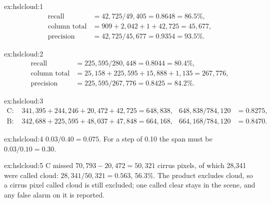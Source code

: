 
\begin{solution}{ex:hslcloud:1}
\begin{align*}
\text{recall} &= 42{,}725/49{,}405 = 0.8648 = 86.5\%,\\
\text{column total} &= 909+2{,}042+1+42{,}725 = 45{,}677,\\
\text{precision} &= 42{,}725/45{,}677 = 0.9354 = 93.5\% .
\end{align*}
\end{solution}

\begin{solution}{ex:hslcloud:2}
\begin{align*}
\text{recall} &= 225{,}595/280{,}448 = 0.8044 = 80.4\%,\\
\text{column total} &= 25{,}158+225{,}595+15{,}888+1{,}135 = 267{,}776,\\
\text{precision} &= 225{,}595/267{,}776 = 0.8425 = 84.2\% .
\end{align*}
\end{solution}

\begin{solution}{ex:hslcloud:3}
\begin{align*}
\text{C: } & 341{,}395+244{,}246+20{,}472+42{,}725 = 648{,}838, & 648{,}838/784{,}120 &= 0.8275,\\
\text{B: } & 342{,}688+225{,}595+48{,}037+47{,}848 = 664{,}168, & 664{,}168/784{,}120 &= 0.8470 .
\end{align*}
\end{solution}

\begin{solution}{ex:hslcloud:4}
$0.03/0.40=0.075$. For a step of 0.10 the span must be $0.03/0.10=0.30$.
\end{solution}

\begin{solution}{ex:hslcloud:5}
C missed $70{,}793-20{,}472=50{,}321$ cirrus pixels, of which 28,341 were called cloud: $28{,}341/50{,}321=0.563$, 56.3\%.
The product excludes cloud, so a cirrus pixel called cloud is still excluded; one called clear stays in the scene, and any
false alarm on it is reported.
\end{solution}
